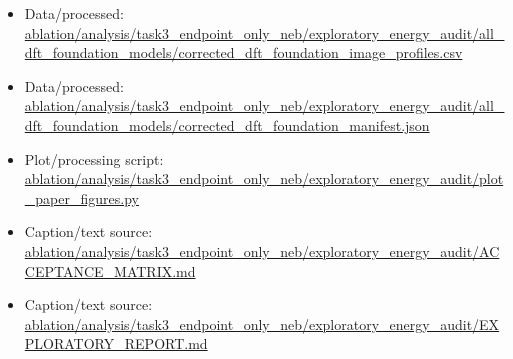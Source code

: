 \begin{itemize}[leftmargin=1.4em,noitemsep]
\item Data/processed: \begingroup\scriptsize\url{ablation/analysis/task3_endpoint_only_neb/exploratory_energy_audit/all_dft_foundation_models/corrected_dft_foundation_image_profiles.csv}\endgroup
\item Data/processed: \begingroup\scriptsize\url{ablation/analysis/task3_endpoint_only_neb/exploratory_energy_audit/all_dft_foundation_models/corrected_dft_foundation_manifest.json}\endgroup
\item Plot/processing script: \begingroup\scriptsize\url{ablation/analysis/task3_endpoint_only_neb/exploratory_energy_audit/plot_paper_figures.py}\endgroup
\item Caption/text source: \begingroup\scriptsize\url{ablation/analysis/task3_endpoint_only_neb/exploratory_energy_audit/ACCEPTANCE_MATRIX.md}\endgroup
\item Caption/text source: \begingroup\scriptsize\url{ablation/analysis/task3_endpoint_only_neb/exploratory_energy_audit/EXPLORATORY_REPORT.md}\endgroup
\end{itemize}
